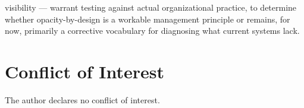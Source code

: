 \documentclass[10pt]{article}
\begin{document}
visibility --- warrant testing against actual organizational practice, to determine whether opacity-by-design is a workable management principle or remains, for now, primarily a corrective vocabulary for diagnosing what current systems lack.

\newpage
\section*{Conflict of Interest}
The author declares no conflict of interest.

\end{document}
